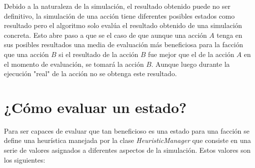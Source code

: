 \documentclass[twoside]{article}
\begin{document}
		Debido a la naturaleza de la simulaci\'on, el resultado obtenido puede no ser definitivo, la simulaci\'on de una acci\'on tiene diferentes posibles estados como resultado pero el algoritmo solo eval\'ua el resultado obtenido de una simulaci\'on
		concreta. Esto abre paso a que se el caso de que aunque una acci\'on $A$ tenga en sus posibles resultados una media de evaluaci\'on m\'as beneficiosa para la facci\'on que una acci\'on $B$ si el resultado de la acci\'on $B$ fue mejor que el de la acci\'on $A$ en el momento de evaluaci\'on, se tomar\'a la acci\'on $B$. Aunque luego durante la ejecuci\'on "real" de la acci\'on no se obtenga este resultado.
		
		\section{¿C\'omo evaluar un estado?}
		
		Para ser capaces de evaluar que tan beneficioso es una estado para una facci\'on se define una heur\'istica manejada por la clase \emph{HeuristicManager} que consiste en una serie de valores asignados a diferentes aspectos de la simulaci\'on. Estos valores son los siguientes:
		
\end{document}

